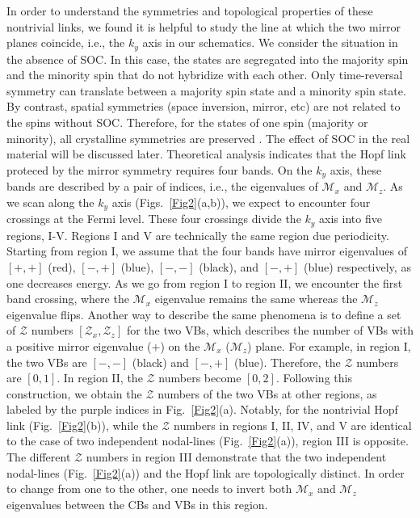 \documentclass[aps,prl,superscriptaddress,twocolumn,showpacs]{revtex4-1}
\begin{document}
In order to understand the symmetries and topological properties of these nontrivial links, we found it is helpful to study the line at which the two mirror planes coincide, i.e., the $k_y$ axis in our schematics. We consider the situation in the absence of SOC. In this case, the states are segregated into the majority spin and the minority spin that do not hybridize with each other. Only time-reversal symmetry can translate between a majority spin state and a minority spin state. By contrast, spatial symmetries (space inversion, mirror, etc) are not related to the spins without SOC. Therefore, for the states of one spin (majority or minority), all crystalline symmetries are preserved \cite{Heusler_Wang}. The effect of SOC in the real material will be discussed later. Theoretical analysis indicates that the Hopf link proteced by the mirror symmetry requires four bands. On the $k_y$ axis, these bands are described by a pair of indices, i.e., the eigenvalues of $\mathcal{M}_x$ and $\mathcal{M}_z$. As we scan along the $k_y$ axis (Figs.~\ref{Fig2}(a,b)), we expect to encounter four crossings at the Fermi level. These four crossings divide the $k_y$ axis into five regions, I-V. Regions I and V are technically the same region due periodicity. Starting from region I, we assume that the four bands have mirror eigenvalues of $[+,+]$ (red), $[-,+]$ (blue), $[-,-]$ (black), and $[-,+]$ (blue) respectively, as one decreases energy. As we go from region I to region II, we encounter the first band crossing, where the $\mathcal{M}_x$ eigenvalue remains the same whereas the $\mathcal{M}_z$ eigenvalue flips. Another way to describe the same phenomena is to define a set of $\mathcal{Z}$ numbers $[\mathcal{Z}_x, \mathcal{Z}_z]$ for the two VBs, which describes the number of VBs with a positive mirror eigenvalue ($+$) on the $\mathcal{M}_x$ ($\mathcal{M}_z$) plane. For example, in region I, the two VBs are $[-,-]$ (black) and $[-,+]$ (blue). Therefore, the $\mathcal{Z}$ numbers are $[0,1]$. In region II, the $\mathcal{Z}$ numbers become $[0,2]$. Following this construction, we obtain the $\mathcal{Z}$ numbers of the two VBs at other regions, as labeled by the purple indices in Fig.~\ref{Fig2}(a). Notably, for the nontrivial Hopf link (Fig.~\ref{Fig2}(b)), while the $\mathcal{Z}$ numbers in regions I, II, IV, and V are identical to the case of two independent nodal-lines (Fig.~\ref{Fig2}(a)), region III is opposite. The different $\mathcal{Z}$ numbers in region III demonstrate that the two independent nodal-lines (Fig.~\ref{Fig2}(a)) and the Hopf link are topologically distinct. In order to change from one to the other, one needs to invert both $\mathcal{M}_x$ and $\mathcal{M}_z$ eigenvalues between the CBs and VBs in this region.
\end{document}
